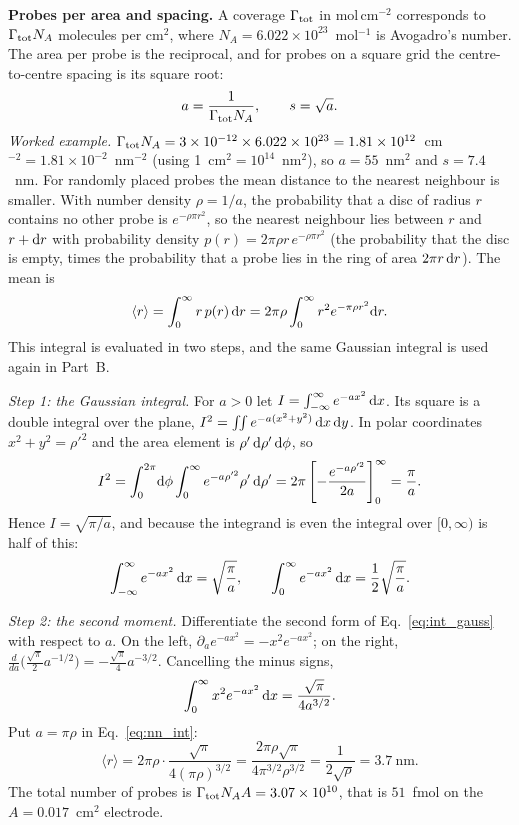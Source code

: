 \documentclass[10pt,a4paper]{article}
\numberwithin{equation}{section}
\newcommand{\Grtot}{\Gamma_{\rm tot}}
\newcommand{\areaPerProbeNM}{55}
\newcommand{\nProbes}{\ensuremath{3.07\times10^{10}}}
\newcommand{\nProbesFmol}{51}
\newcommand{\nnRandom}{3.7}
\newcommand{\spacingNM}{7.4}
\begin{document}
\textbf{Probes per area and spacing.} A coverage $\Grtot$ in mol\,cm$^{-2}$
corresponds to $\Grtot N_A$ molecules per cm$^2$, where $N_A=6.022\times10^{23}$~mol$^{-1}$ is
Avogadro's number. The area per probe is the reciprocal, and for probes on a square grid
the centre-to-centre spacing is its square root:
\begin{equation}
  a=\frac{1}{\Grtot N_A},\qquad s=\sqrt{a}.
  \label{eq:spacing}
\end{equation}
\emph{Worked example.} $\Grtot N_A = 3\times10^{-12}\times6.022\times10^{23}
=1.81\times10^{12}$~cm$^{-2}=1.81\times10^{-2}$~nm$^{-2}$ (using
1~cm$^2=10^{14}$~nm$^2$), so $a=\areaPerProbeNM$~nm$^2$ and $s=\spacingNM$~nm. For randomly
placed probes the mean distance to the nearest neighbour is smaller. With number density $\rho=1/a$, the
probability that a disc of radius $r$ contains no other probe is $e^{-\rho\pi r^2}$, so the nearest neighbour lies
between $r$ and $r+{\rm d}r$ with probability density $p(r)=2\pi\rho r\,e^{-\rho\pi r^2}$ (the probability that the
disc is empty, times the probability that a probe lies in the ring of area $2\pi r\,{\rm d}r$). The mean is
\begin{equation}
  \langle r\rangle=\int_0^\infty r\,p(r)\,{\rm d}r=2\pi\rho\int_0^\infty r^2e^{-\pi\rho r^2}{\rm d}r .
  \label{eq:nn_int}
\end{equation}
This integral is evaluated in two steps, and the same Gaussian integral is used again in Part~B.

\emph{Step 1: the Gaussian integral.} For $a>0$ let $I=\int_{-\infty}^{\infty}e^{-ax^2}\,{\rm d}x$. Its square is a double
integral over the plane, $I^2=\int\!\!\int e^{-a(x^2+y^2)}\,{\rm d}x\,{\rm d}y$. In polar coordinates $x^2+y^2=\rho'^2$ and the
area element is $\rho'\,{\rm d}\rho'\,{\rm d}\phi$, so
\[
  I^2=\int_0^{2\pi}\!{\rm d}\phi\int_0^\infty e^{-a\rho'^2}\rho'\,{\rm d}\rho'
  =2\pi\left[-\frac{e^{-a\rho'^2}}{2a}\right]_0^\infty=\frac{\pi}{a}.
\]
Hence $I=\sqrt{\pi/a}$, and because the integrand is even the integral over $[0,\infty)$ is half of this:
\begin{equation}
  \int_{-\infty}^{\infty}e^{-ax^2}\,{\rm d}x=\sqrt{\frac{\pi}{a}},\qquad
  \int_{0}^{\infty}e^{-ax^2}\,{\rm d}x=\frac12\sqrt{\frac{\pi}{a}} .
  \label{eq:int_gauss}
\end{equation}

\emph{Step 2: the second moment.} Differentiate the second form of Eq.~\eqref{eq:int_gauss} with respect to $a$. On the left,
$\partial_ae^{-ax^2}=-x^2e^{-ax^2}$; on the right, $\frac{d}{da}\bigl(\tfrac{\sqrt\pi}{2}a^{-1/2}\bigr)=-\tfrac{\sqrt\pi}{4}a^{-3/2}$. Cancelling
the minus signs,
\begin{equation}
  \int_0^\infty x^2e^{-ax^2}\,{\rm d}x=\frac{\sqrt\pi}{4a^{3/2}} .
  \label{eq:int_r2}
\end{equation}
Put $a=\pi\rho$ in Eq.~\eqref{eq:nn_int}:
\[
  \langle r\rangle=2\pi\rho\cdot\frac{\sqrt\pi}{4(\pi\rho)^{3/2}}=\frac{2\pi\rho\sqrt\pi}{4\pi^{3/2}\rho^{3/2}}
  =\frac{1}{2\sqrt\rho}=\nnRandom~\text{nm}.
\]
The total number of probes
is $\Grtot N_A A=\nProbes$, that is $\nProbesFmol$~fmol on the
$A=0.017$~cm$^2$ electrode.
\end{document}
